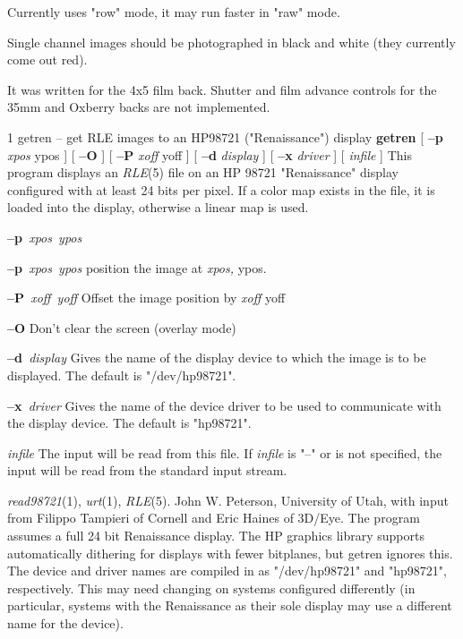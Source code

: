 Currently uses "row" mode, it may run faster in "raw" mode.

Single channel images should be photographed in black and white (they 
currently come out red).

It was written for the 4x5 film back.  Shutter and film advance controls
for the 35mm and Oxberry backs are not implemented.
\newpage


%
%
%
 1
getren -- get RLE images to an HP98721 ("Renaissance") display
{\bf getren}
[
{\bf --p} 
{\it xpos} ypos
] [
{\bf --O}
] [
{\bf --P}
{\it xoff} yoff
] [
{\bf --d}
{\it display}
] [
{\bf --x}
{\it driver}
] [ 
{\it infile}
]
This program displays an
{\it RLE}{\rm (5)}
file on an HP 98721 "Renaissance" display configured with at
least 24 bits per pixel.  If a color map exists in the file,
it is loaded into the display, otherwise a linear map is used.
\begin{TPlist}{{\bf --p}{\it \ xpos\ ypos}
}
\item[{{\bf --p}{\it \ xpos\ ypos}
}]
position the image at 
{\it xpos,} ypos.
\item[{{\bf --P}{\it \ xoff\ yoff}
}]
Offset the image position by
{\it xoff} yoff
\item[{{\bf --O}}]
Don't clear the screen (overlay mode)
\item[{{\bf --d}{\it \ display}
}]
Gives the name of the display device to which the image is to be
displayed.  The default is "/dev/hp98721".
\item[{{\bf --x}{\it \ driver}
}]
Gives the name of the device driver to be used to communicate with
the display device.  The default is "hp98721".
\item[{{\it infile}}]
The input will be read from this file.  If
{\it infile}
is "--" or is not specified, the input will be read from the standard
input stream.
\end{TPlist}
{\it read98721}{\rm (1),}
{\it urt}{\rm (1),}
{\it RLE}{\rm (5).}
John W. Peterson, University of Utah, with input from Filippo Tampieri of
Cornell and Eric Haines of 3D/Eye.
The program assumes a full 24 bit Renaissance display.  The HP graphics
library supports automatically dithering for displays with fewer bitplanes,
but getren ignores this.
\nwl
The device and driver names are compiled in as "/dev/hp98721" and "hp98721",
respectively.  This may need changing on systems configured differently
(in particular, systems with the Renaissance as their sole display
may use a different name for the device).
\newpage


